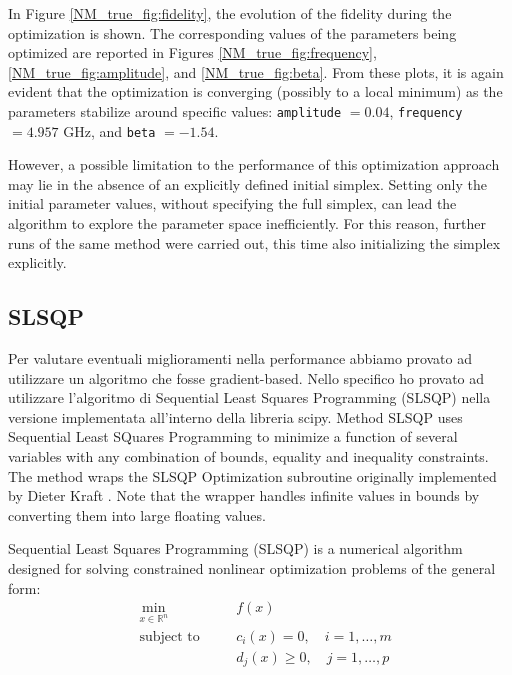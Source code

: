 In Figure \ref{NM_true_fig:fidelity}, the evolution of the fidelity during the optimization is shown. 
The corresponding values of the parameters being optimized are reported in Figures \ref{NM_true_fig:frequency}, \ref{NM_true_fig:amplitude}, and \ref{NM_true_fig:beta}. 
From these plots, it is again evident that the optimization is converging (possibly to a local minimum) as the parameters stabilize around specific values: \texttt{amplitude} $= 0.04$, \texttt{frequency} $= 4.957$ GHz, and \texttt{beta} $= -1.54$.

However, a possible limitation to the performance of this optimization approach may lie in the absence of an explicitly defined initial simplex. 
Setting only the initial parameter values, without specifying the full simplex, can lead the algorithm to explore the parameter space inefficiently. 
For this reason, further runs of the same method were carried out, this time also initializing the simplex explicitly.

\subsection{SLSQP}
Per valutare eventuali miglioramenti nella performance abbiamo provato ad utilizzare un algoritmo che fosse gradient-based. 
Nello specifico ho provato ad utilizzare l'algoritmo di Sequential Least Squares Programming (SLSQP) nella versione implementata all'interno della libreria scipy.
Method SLSQP uses Sequential Least SQuares Programming to minimize a function of several variables with any combination of bounds, equality and inequality constraints. 
The method wraps the SLSQP Optimization subroutine originally implemented by Dieter Kraft \cite{kraft1988slsqp}.  
Note that the wrapper handles infinite values in bounds by converting them into large floating values.

Sequential Least Squares Programming (SLSQP) is a numerical algorithm designed for solving constrained nonlinear optimization problems of the general form:
\begin{align*}
& \min_{x \in \mathbb{R}^n} \quad && f(x) \\
& \text{subject to} \quad && c_i(x) = 0, \quad i = 1, \dots, m \\
& && d_j(x) \geq 0, \quad j = 1, \dots, p
\end{align*}

